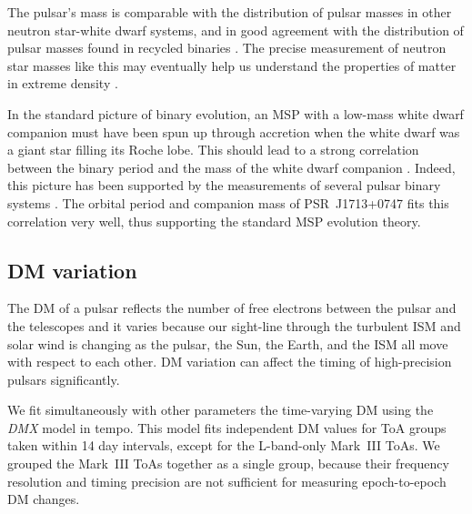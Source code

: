 The pulsar's mass is comparable with the distribution of pulsar masses
in other neutron star-white dwarf systems, and in good
agreement with the distribution of pulsar masses found in recycled binaries
\citep{opns12,kkdt13}. The precise measurement of neutron star masses like this
may eventually help us understand the properties of matter in extreme 
density \citep{lat12}.

In the standard picture of binary evolution, an MSP with a low-mass white dwarf companion must have been spun up through accretion when the white dwarf was a giant star filling its Roche lobe. 
This should lead to a strong correlation between the binary period and the mass of the white dwarf companion \citep{rpj+95, ts99a, prp02b}. 
Indeed, this picture has been supported by the measurements of several pulsar
binary systems \citep[e.g.,][]{vbb+01, ktr94, th14}.  
The orbital period and companion mass of PSR~J1713+0747 fits
this correlation very well, thus supporting the standard MSP evolution theory. %




\subsection{DM variation}
\label{sec:dmx}
The DM of a pulsar reflects the number of free electrons between
the pulsar and the telescopes and it varies because
our sight-line through the turbulent ISM and solar wind is changing as the
pulsar, the Sun, the Earth, and the ISM all move with respect to each other.
DM variation can affect the timing of high-precision pulsars significantly.

We fit simultaneously with other parameters the time-varying DM using the {\it DMX} model in {\sc tempo}.
This model fits independent DM values for ToA groups taken within 14 day
intervals, except for the L-band-only Mark~III ToAs. We grouped the Mark~III
ToAs together as a single group, because their frequency resolution and timing
precision are not sufficient for measuring epoch-to-epoch DM changes.

